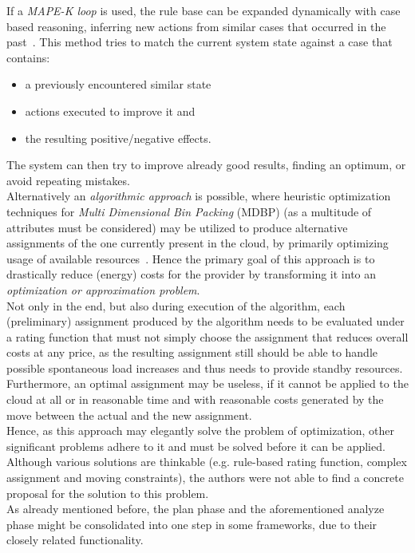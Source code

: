 \documentclass[a4paper]{llncs}
\begin{document}
If a \textit{MAPE-K loop} is used, the rule base can be expanded dynamically with case based reasoning, inferring new actions from similar cases that occurred in the past~\cite{Maurer10}. This method tries to match the current system state against a case that contains:
\begin{itemize}
	\item a previously encountered similar state
	\item actions executed to improve it and
	\item the resulting positive/negative effects.
\end{itemize}

The system can then try to improve already good results, finding an optimum, or avoid repeating mistakes.\\

Alternatively an \textit{algorithmic approach} is possible, where heuristic optimization techniques for \textit{Multi Dimensional Bin Packing} (MDBP) (as a multitude of attributes must be considered) may be utilized to produce alternative assignments of the one currently present in the cloud, by primarily optimizing usage of available resources~\cite{Feller11}. Hence the primary goal of this approach is to drastically reduce (energy) costs for the provider by transforming it into an \textit{optimization or approximation problem}.\\
Not only in the end, but also during execution of the algorithm, each (preliminary) assignment produced by the algorithm needs to be evaluated under a rating function that must not simply choose the assignment that reduces overall costs at any price, as the resulting assignment still should be able to handle possible spontaneous load increases and thus needs to provide standby resources.\\
Furthermore, an optimal assignment may be useless, if it cannot be applied to the cloud at all or in reasonable time and with reasonable costs generated by the move between the actual and the new assignment.\\
Hence, as this approach may elegantly solve the problem of optimization, other significant problems adhere to it and must be solved before it can be applied. Although various solutions are thinkable (e.g. rule-based rating function, complex assignment and moving constraints), the authors were not able to find a concrete proposal for the solution to this problem.\\

As already mentioned before, the plan phase and the aforementioned analyze phase might be consolidated into one step in some frameworks, due to their closely related functionality.
\end{document}
